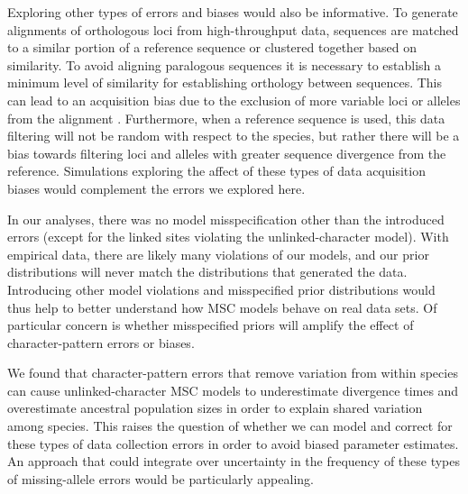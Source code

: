 Exploring other types of errors and biases would also be informative.
To generate alignments of orthologous loci from high-throughput data, 
sequences are matched to a similar portion of a reference sequence or 
clustered together based on similarity. To avoid aligning paralogous sequences 
it is necessary to establish a minimum level of similarity for establishing 
orthology between sequences. This can lead to an acquisition bias due to the 
exclusion of more variable loci or alleles from the alignment \citep{huang2016unforeseen}.
Furthermore, when a reference 
sequence is used, this data filtering will not be random with respect to the
species, but rather there will be a bias towards filtering loci and alleles
with greater sequence divergence from the reference. 
Simulations exploring the affect of these types of data acquisition biases
would complement the errors we explored here.

In our analyses, there was no model misspecification other than the introduced
errors (except for the linked sites violating the unlinked-character model).
With empirical data, there are likely many violations of our models,
and our prior distributions will never match the distributions that generated
the data.
Introducing other model violations and misspecified prior distributions
would thus help to better understand how MSC models behave on real
data sets.
Of particular concern is whether misspecified priors will amplify the effect of
character-pattern errors or biases.

We found that character-pattern errors that remove variation from within
species can cause unlinked-character MSC models to underestimate divergence
times and overestimate ancestral population sizes in order to explain shared
variation among species.
This raises the question of whether we can model and correct for these types of
data collection errors in order to avoid biased parameter estimates.
An approach that could integrate over uncertainty in the frequency of these
types of missing-allele errors would be particularly appealing.


